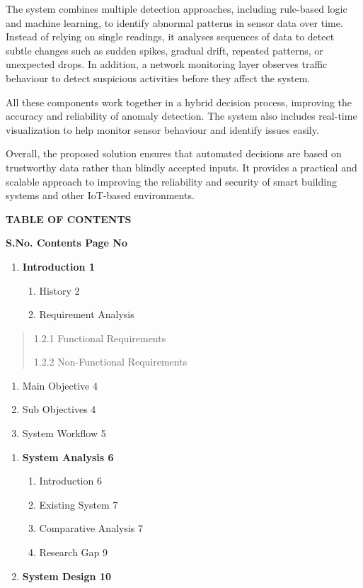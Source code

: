 The system combines multiple detection approaches, including rule-based
logic and machine learning, to identify abnormal patterns in sensor data
over time. Instead of relying on single readings, it analyses sequences
of data to detect subtle changes such as sudden spikes, gradual drift,
repeated patterns, or unexpected drops. In addition, a network
monitoring layer observes traffic behaviour to detect suspicious
activities before they affect the system.

All these components work together in a hybrid decision process,
improving the accuracy and reliability of anomaly detection. The system
also includes real-time visualization to help monitor sensor behaviour
and identify issues easily.

Overall, the proposed solution ensures that automated decisions are
based on trustworthy data rather than blindly accepted inputs. It
provides a practical and scalable approach to improving the reliability
and security of smart building systems and other IoT-based environments.

\textbf{TABLE OF CONTENTS}

\textbf{S.No. Contents Page No}

\begin{enumerate}
\def\labelenumi{\arabic{enumi}.}
\item
  \textbf{Introduction 1}

  \begin{enumerate}
  \def\labelenumii{\arabic{enumii}.}
  \item
    History 2
  \item
    Requirement Analysis
  \end{enumerate}
\end{enumerate}

\begin{quote}
1.2.1 Functional Requirements

1.2.2 Non-Functional Requirements
\end{quote}

\begin{enumerate}
\def\labelenumi{\arabic{enumi}.}
\setcounter{enumi}{2}
\item
  Main Objective 4
\item
  Sub Objectives 4
\item
  System Workflow 5
\end{enumerate}

\begin{enumerate}
\def\labelenumi{\arabic{enumi}.}
\setcounter{enumi}{1}
\item
  \textbf{System Analysis 6}

  \begin{enumerate}
  \def\labelenumii{\arabic{enumii}.}
  \item
    Introduction 6
  \item
    Existing System 7
  \item
    Comparative Analysis 7
  \item
    Research Gap 9
  \end{enumerate}
\item
  \textbf{System Design 10}
\end{enumerate}

